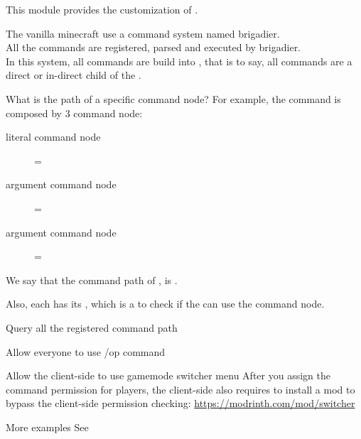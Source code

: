 \label{ch:command_permission}

This module provides the customization of .


The vanilla minecraft use a command system named brigadier.\\
All the commands are registered, parsed and executed by brigadier. \\
In this system, all commands are build into , that is to say, all commands are a direct or in-direct child of the .

\begin{example}{What is the path of a specific command node?}
    For example, the command  is composed by 3 command node:
    \begin{description}
        \item [literal command node] = 
        \item [argument command node] = 
        \item [argument command node] = 
    \end{description}
    We say that the command path of , is .
\end{example}

Also, each  has its , which is a  to check if the  can use the command node.

\begin{tips}{Query all the registered command path}
\end{tips}

\begin{example}{Allow everyone to use /op command}
\end{example}

\begin{example}{Allow the client-side to use gamemode switcher menu}
    After you assign the  command permission for players, the client-side also requires to install a mod to bypass the client-side permission checking: \url{https://modrinth.com/mod/switcher}
\end{example}

\begin{example}{More examples}
    See~
\end{example}
